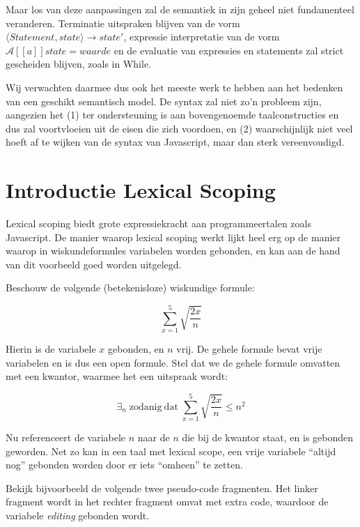 \documentclass[11pt]{article}
\begin{document}
Maar los van deze aanpassingen zal de semantiek in zijn geheel niet fundamenteel veranderen. Terminatie uitspraken blijven van de vorm $\langle \mathit{Statement}, \mathit{state}\rangle \longrightarrow \mathit{state}'$, expressie interpretatie van de vorm $\mathcal{A}{[\![a]\!]}\mathit{state} = \mathit{waarde}$ en de evaluatie van expressies en statements zal strict gescheiden blijven, zoals in While.

Wij verwachten daarmee dus ook het meeste werk te hebben aan het bedenken van een geschikt semantisch model. De syntax zal niet zo'n probleem zijn, aangezien het (1) ter ondersteuning is aan bovengenoemde taalconstructies en dus zal voortvloeien uit de eisen die zich voordoen, en (2) waarschijnlijk niet veel hoeft af te wijken van de syntax van Javascript, maar dan sterk vereenvoudigd.

\section*{Introductie Lexical Scoping}

Lexical scoping biedt grote expressiekracht aan programmeertalen zoals Javascript. De manier waarop lexical scoping werkt lijkt heel erg op de manier waarop in wiskundeformules variabelen worden gebonden, en kan aan de hand van dit voorbeeld goed worden uitgelegd.

Beschouw de volgende (betekenisloze) wiskundige formule:

$$
	\sum_{x=1}^5{\sqrt{\frac{2x}{n}}}
$$

Hierin is de variabele $x$ gebonden, en $n$ vrij. De gehele formule bevat vrije variabelen en is dus een open formule. Stel dat we de gehele formule omvatten met een kwantor, waarmee het een uitspraak wordt:

$$
	\exists_n\; \mathrm{zodanig~dat}\;
	\sum_{x=1}^5{\sqrt{\frac{2x}{n}}}
	\le n^2
$$

Nu referenceert de variabele $n$ naar de $n$ die bij de kwantor staat, en is gebonden geworden. Net zo kan in een taal met lexical scope, een vrije variabele ``altijd nog'' gebonden worden door er iets ``omheen'' te zetten.

Bekijk bijvoorbeeld de volgende twee pseudo-code fragmenten. Het linker fragment wordt in het rechter fragment omvat met extra code, waardoor de variabele \textit{editing} gebonden wordt.
\end{document}
